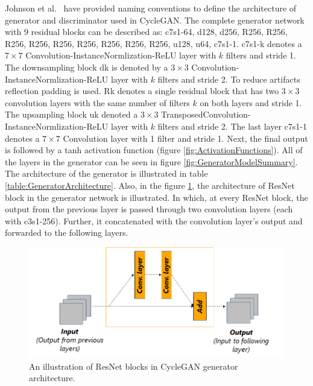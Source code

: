 Johnson et al.\ \cite{johnson2016perceptual} have provided naming conventions to define the architecture of generator and discriminator used in \ac{CycleGAN}. The complete generator network with 9 residual blocks can be described as: {\selectfont c7s1-64, d128, d256, R256, R256, R256, R256, R256, R256, R256, R256, R256, u128, u64, c7s1-1}. {\selectfont c7s1-k} denotes a $7 \times 7$ Convolution-InstanceNormlization-ReLU layer with $k$ filters and stride 1. The downsampling block {\selectfont dk} is denoted by a $3 \times 3$ Convolution-InstanceNormlization-ReLU layer with $k$ filters and stride 2. To reduce artifacts reflection padding is used. {\selectfont Rk} denotes a single residual block that has two $3 \times 3$ convolution layers with the same number of filters $k$ on both layers and stride 1. The upsampling block {\selectfont uk} denoted a $3 \times 3$ TransposedConvolution-InstanceNormlization-ReLU layer with $k$ filters and stride 2. The last layer {\selectfont c7s1-1} denotes a $7 \times 7$ Convolution layer with 1 filter and stride 1. Next, the final output is followed by a tanh activation function (figure \ref{fig:ActivationFunctions}). All of the layers in the generator can be seen in figure \ref{fig:GeneratorModelSummary}. The architecture of the generator is illustrated in table \ref{table:GeneratorArchitecture}. Also, in the figure \ref{fig:resnetBlock}, the architecture of \ac{ResNet} block in the generator network is illustrated. In which, at every \ac{ResNet} block, the output from the previous layer is passed through two convolution layers (each with {\selectfont c3s1-256}). Further, it concatenated with the convolution layer's output and forwarded to the following layers.


\vspace*{1.0cm}
\begin{figure}[H]
        \begin{center}
	    \includegraphics[scale=0.65]{images/Implementation/resnetBlocks.png}
	    \caption[An illustration of ResNet blocks in \ac{CycleGAN} generator architecture.]{An illustration of ResNet blocks in \ac{CycleGAN} generator architecture.}
	    \label{fig:resnetBlock}
	    \end{center}
\end{figure}


